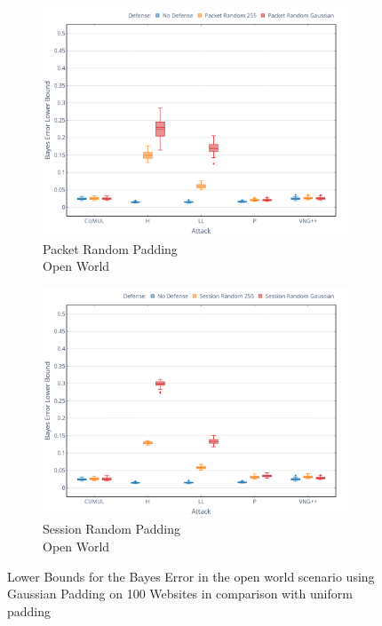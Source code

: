\documentclass[
	ruledheaders=chapter,
	class=report,
	thesis={type=master, department=inf},
	accentcolor=1c,
	custommargins=true,
	marginpar=false,
	parskip=half-,
	fontsize=11pt,
]{tudapub}
\begin{document}
	\begin{figure}
		\begin{subfigure}{0.495\textwidth}
			\centering
			\includegraphics[width=\textwidth]{plots/bounds_ow_pkt.png}
			\caption{Packet Random Padding\\Open World}
		\end{subfigure}
		\hfill
		\begin{subfigure}{0.495\textwidth}
			\centering
			\includegraphics[width=\textwidth]{plots/bounds_ow_ses.png}
			\caption{Session Random Padding\\Open World}
		\end{subfigure}
		\caption[Lower Bounds for the Bayes Error in the open world scenario]{Lower Bounds for the Bayes Error in the open world scenario using Gaussian Padding on 100 Websites in comparison with uniform padding}
		\label{fig:bound_ow}
	\end{figure}
\end{document}
